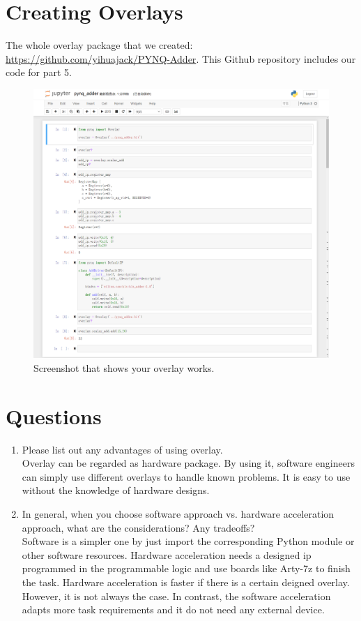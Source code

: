 \documentclass[a4paper]{article}
\begin{document}
\section{Creating Overlays}
The whole overlay package that we created: \url{https://github.com/yihuajack/PYNQ-Adder}. This Github repository includes our code for part 5. 
\begin{figure}[H]
    \centering
    \includegraphics[width=1\textwidth]{5.png}
    \caption{Screenshot that shows your overlay works.}
\end{figure}
\section{Questions}
\begin{enumerate}
\item Please list out any advantages of using overlay.\\
Overlay can be regarded as hardware package. By using it, software engineers can simply use different overlays to handle known problems. It is easy to use without the knowledge of hardware designs.
\item In general, when you choose software approach vs. hardware acceleration approach, what are the considerations? Any tradeoffs?\\
Software is a simpler one by just import the corresponding Python module or other software resources. Hardware acceleration needs a designed ip programmed in the programmable logic and use boards like Arty-7z to finish the task. Hardware acceleration is faster if there is a certain deigned overlay. However, it is not always the case. In contrast, the software acceleration adapts more task requirements and it do not need any external device.
\end{enumerate}
\printbibliography
\end{document}
